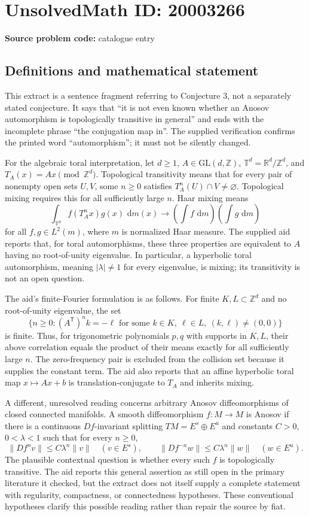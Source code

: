 \documentclass[11pt]{article}
\newcommand{\Z}{\mathbb{Z}}
\newcommand{\R}{\mathbb{R}}
\newcommand{\dd}{\,\mathrm{d}}
\begin{document}
\section*{UnsolvedMath ID: 20003266}
\textbf{Source problem code:} catalogue entry
\subsection{Definitions and mathematical statement}
This extract is a sentence fragment referring to Conjecture 3, not a separately stated conjecture. It says that ``it is not even known whether an Anosov automorphism is topologically transitive in general'' and ends with the incomplete phrase ``the conjugation map in''. The supplied verification confirms the printed word ``automorphism''; it must not be silently changed.

For the algebraic toral interpretation, let $d\ge1$, $A\in\mathrm{GL}(d,\Z)$, $\mathbb T^d=\R^d/\Z^d$, and $T_A(x)=Ax\pmod{\Z^d}$. Topological transitivity means that for every pair of nonempty open sets $U,V$, some $n\ge0$ satisfies $T_A^n(U)\cap V\ne\varnothing$. Topological mixing requires this for all sufficiently large $n$. Haar mixing means
\[
 \int_{\mathbb T^d} f(T_A^n x)g(x)\,\dd m(x)
 \longrightarrow \left(\int f\,\dd m\right)\left(\int g\,\dd m\right)
\]
for all $f,g\in L^2(m)$, where $m$ is normalized Haar measure. The supplied aid reports that, for toral automorphisms, these three properties are equivalent to $A$ having no root-of-unity eigenvalue. In particular, a hyperbolic toral automorphism, meaning $|\lambda|\ne1$ for every eigenvalue, is mixing; its transitivity is not an open question.

The aid's finite-Fourier formulation is as follows. For finite $K,L\subset\Z^d$ and no root-of-unity eigenvalue, the set
\[
 \{n\ge0:(A^{\mathsf T})^n k=-\ell
       \text{ for some }k\in K,\ \ell\in L,\ (k,\ell)\ne(0,0)\}
\]
is finite. Thus, for trigonometric polynomials $p,q$ with supports in $K,L$, their above correlation equals the product of their means exactly for all sufficiently large $n$. The zero-frequency pair is excluded from the collision set because it supplies the constant term. The aid also reports that an affine hyperbolic toral map $x\mapsto Ax+b$ is translation-conjugate to $T_A$ and inherits mixing.

A different, unresolved reading concerns arbitrary Anosov diffeomorphisms of closed connected manifolds. A smooth diffeomorphism $f:M\to M$ is Anosov if there is a continuous $Df$-invariant splitting $TM=E^s\oplus E^u$ and constants $C>0$, $0<\lambda<1$ such that for every $n\ge0$,
\[
 \|Df^n v\|\le C\lambda^n\|v\|\quad(v\in E^s),\qquad
 \|Df^{-n}w\|\le C\lambda^n\|w\|\quad(w\in E^u).
\]
The plausible contextual question is whether every such $f$ is topologically transitive. The aid reports this general assertion as still open in the primary literature it checked, but the extract does not itself supply a complete statement with regularity, compactness, or connectedness hypotheses. These conventional hypotheses clarify this possible reading rather than repair the source by fiat.
\end{document}

